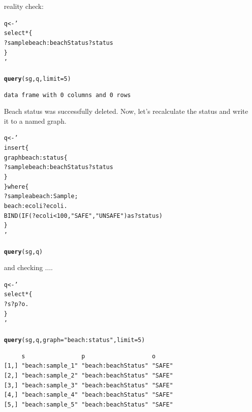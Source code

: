 \documentclass{article}\usepackage[]{graphicx}\usepackage[]{xcolor}
\makeatletter
\newcommand{\hlnum}[1]{\textcolor[rgb]{0.686,0.059,0.569}{#1}}%
\newcommand{\hlstr}[1]{\textcolor[rgb]{0.192,0.494,0.8}{#1}}%
\newcommand{\hlstd}[1]{\textcolor[rgb]{0.345,0.345,0.345}{#1}}%
\newcommand{\hlkwb}[1]{\textcolor[rgb]{0.69,0.353,0.396}{#1}}%
\newcommand{\hlkwc}[1]{\textcolor[rgb]{0.333,0.667,0.333}{#1}}%
\newcommand{\hlkwd}[1]{\textcolor[rgb]{0.737,0.353,0.396}{\textbf{#1}}}%
\newenvironment{kframe}{%
 \def\at@end@of@kframe{}%
 \ifinner\ifhmode%
  \def\at@end@of@kframe{\end{minipage}}%
  \begin{minipage}{\columnwidth}%
 \fi\fi%
 \def\FrameCommand##1{\hskip\@totalleftmargin \hskip-\fboxsep
 \colorbox{shadecolor}{##1}\hskip-\fboxsep
     \hskip-\linewidth \hskip-\@totalleftmargin \hskip\columnwidth}%
 \MakeFramed {\advance\hsize-\width
   \@totalleftmargin\z@ \linewidth\hsize
   \@setminipage}}%
 {\par\unskip\endMakeFramed%
 \at@end@of@kframe}
\newenvironment{knitrout}{}{} %
\makeatother
\begin{document}
reality check:

\begin{knitrout}
\color{fgcolor}\begin{kframe}
\begin{alltt}
\hlstd{q} \hlkwb{<-} \hlstr{'
select * \{
  ?sample beach:beachStatus ?status
\}
'}

\hlkwd{query}\hlstd{(sg, q,} \hlkwc{limit} \hlstd{=} \hlnum{5}\hlstd{)}
\end{alltt}
\end{kframe}
\end{knitrout}

\begin{verbatim}
data frame with 0 columns and 0 rows
\end{verbatim}

Beach status was successfully deleted. Now, let's recalculate the status and write it to a named graph.

\begin{knitrout}
\color{fgcolor}\begin{kframe}
\begin{alltt}
\hlstd{q} \hlkwb{<-} \hlstr{'
insert \{
  graph beach:status \{
    ?sample beach:beachStatus ?status
  \}
\} where \{
  ?sample a beach:Sample ;
    beach:ecoli ?ecoli .
  BIND(IF(?ecoli < 100, "SAFE", "UNSAFE") as ?status)
\}
'}

\hlkwd{query}\hlstd{(sg, q)}
\end{alltt}
\end{kframe}
\end{knitrout}


and checking ....

\begin{knitrout}
\color{fgcolor}\begin{kframe}
\begin{alltt}
\hlstd{q} \hlkwb{<-} \hlstr{'
select * \{
  ?s ?p ?o .
\}
'}

\hlkwd{query}\hlstd{(sg, q,} \hlkwc{graph} \hlstd{=} \hlstr{"beach:status"}\hlstd{,} \hlkwc{limit} \hlstd{=} \hlnum{5}\hlstd{)}
\end{alltt}
\end{kframe}
\end{knitrout}

\begin{verbatim}
     s                p                   o
[1,] "beach:sample_1" "beach:beachStatus" "SAFE"
[2,] "beach:sample_2" "beach:beachStatus" "SAFE"
[3,] "beach:sample_3" "beach:beachStatus" "SAFE"
[4,] "beach:sample_4" "beach:beachStatus" "SAFE"
[5,] "beach:sample_5" "beach:beachStatus" "SAFE"
\end{verbatim}
\end{document}

